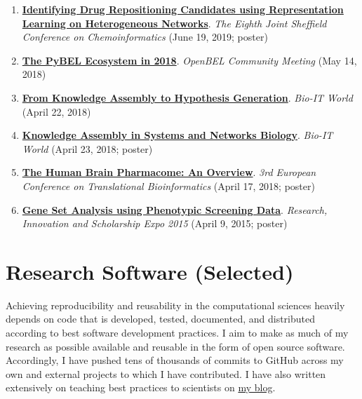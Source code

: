 \documentclass[10pt,a4paper,sans]{moderncv} %
\begin{document}
\begin{enumerate}
    \item \textbf{\href{https://doi.org/10.6084/m9.figshare.8288822.v2}{Identifying Drug Repositioning Candidates using Representation Learning on Heterogeneous Networks}}. \textit{The Eighth Joint Sheffield Conference on Chemoinformatics} (June 19, 2019; poster)

    \item \textbf{\href{https://docs.google.com/presentation/d/1Gsk8LxrVgrICproSgWZ3Gk4BXyOg-UwFlfzhVw5O0t8/edit?usp=sharing}{The PyBEL Ecosystem in 2018}}. \textit{OpenBEL Community Meeting} (May 14, 2018)

    \item \textbf{\href{https://docs.google.com/presentation/d/1_3j8H4f9pQ1m2ZQrF2QNfQNLh5SGqaodnl4AlaAST6w/edit?usp=sharing}{From Knowledge Assembly to Hypothesis Generation}}. \textit{Bio-IT World} (April 22, 2018)

    \item \textbf{\href{https://doi.org/10.6084/m9.figshare.6231701.v1}{Knowledge Assembly in Systems and Networks Biology}}. \textit{Bio-IT World} (April 23, 2018; poster)

    \item \textbf{\href{https://doi.org/10.6084/m9.figshare.6163775.v3}{The Human Brain Pharmacome: An Overview}}. \textit{3rd European Conference on Translational Bioinformatics} (April 17, 2018; poster)

    \item \textbf{\href{https://docs.google.com/presentation/d/1FU8lWGw6x4y9A_qB9rmxSaRRKiC0V3403EJETVGYMzk/edit?usp=sharing}{Gene Set Analysis using Phenotypic Screening Data}}. \textit{Research, Innovation and Scholarship Expo 2015} (April 9, 2015; poster)

\end{enumerate}

\hfill \break

    \section{Research Software (Selected)}\label{sec:software}

    Achieving reproducibility and reusability in the computational
    sciences heavily depends on code that is developed,
    tested, documented, and distributed according to best software
    development practices. I aim to make as much of my research
    as possible available and reusable in the form of open source
    software. Accordingly, I have pushed tens of thousands of commits
    to GitHub across my own and external projects to which I have
    contributed. I have also written extensively on teaching best
    practices to scientists on \href{https://cthoyt.com/software/}{my blog}.
\end{document}
